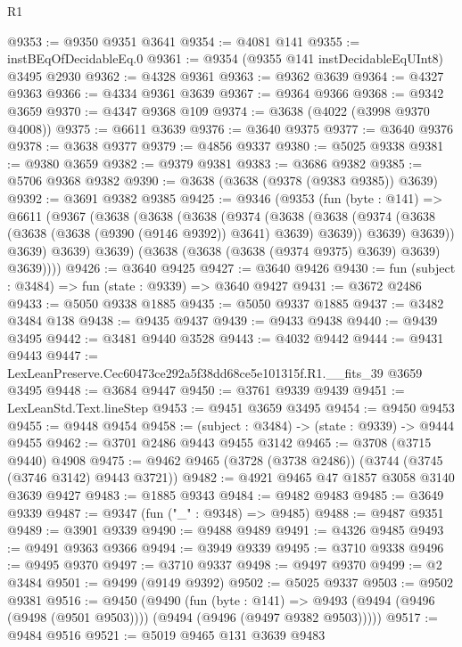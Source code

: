 \begin{lexlean}{R1}
\begin{coremodule}
@9353 := @9350 @9351 @3641
@9354 := @4081 @141
@9355 := instBEqOfDecidableEq.{0}
@9361 := @9354 (@9355 @141 instDecidableEqUInt8) @3495 @2930
@9362 := @4328 @9361
@9363 := @9362 @3639
@9364 := @4327 @9363
@9366 := @4334 @9361 @3639
@9367 := @9364 @9366
@9368 := @9342 @3659
@9370 := @4347 @9368 @109
@9374 := @3638 (@4022 (@3998 @9370 @4008))
@9375 := @6611 @3639
@9376 := @3640 @9375
@9377 := @3640 @9376
@9378 := @3638 @9377
@9379 := @4856 @9337
@9380 := @5025 @9338
@9381 := @9380 @3659
@9382 := @9379 @9381
@9383 := @3686 @9382
@9385 := @5706 @9368 @9382
@9390 := @3638 (@3638 (@9378 (@9383 @9385)) @3639)
@9392 := @3691 @9382 @9385
@9425 := @9346
    (@9353
      (fun (byte : @141) =>
      @6611
        (@9367
          (@3638
            (@3638
              (@3638
                (@9374
                  (@3638
                    (@3638
                      (@9374 (@3638 (@3638 (@3638 (@9390 (@9146 @9392)) @3641) @3639) @3639))
                      @3639)
                    @3639))
                @3639)
              @3639)
            @3639)
          (@3638 (@3638 (@3638 (@9374 @9375) @3639) @3639) @3639))))
@9426 := @3640 @9425
@9427 := @3640 @9426
@9430 := fun (subject : @3484) => fun (state : @9339) => @3640 @9427
@9431 := @3672 @2486
@9433 := @5050 @9338 @1885
@9435 := @5050 @9337 @1885
@9437 := @3482 @3484 @138
@9438 := @9435 @9437
@9439 := @9433 @9438
@9440 := @9439 @3495
@9442 := @3481 @9440 @3528
@9443 := @4032 @9442
@9444 := @9431 @9443
@9447 := LexLeanPreserve.Cec60473ce292a5f38dd68ce5e101315f.R1.__fits_39 @3659 @3495
@9448 := @3684 @9447
@9450 := @3761 @9339 @9439
@9451 := LexLeanStd.Text.lineStep
@9453 := @9451 @3659 @3495
@9454 := @9450 @9453
@9455 := @9448 @9454
@9458 := (subject : @3484) -> (state : @9339) -> @9444 @9455
@9462 := @3701 @2486 @9443 @9455 @3142
@9465 := @3708 (@3715 @9440) @4908
@9475 := @9462 @9465 (@3728 (@3738 @2486)) (@3744 (@3745 (@3746 @3142) @9443 @3721))
@9482 := @4921 @9465 @47 @1857 @3058 @3140 @3639 @9427
@9483 := @1885 @9343
@9484 := @9482 @9483
@9485 := @3649 @9339
@9487 := @9347 (fun ("_" : @9348) => @9485)
@9488 := @9487 @9351
@9489 := @3901 @9339
@9490 := @9488 @9489
@9491 := @4326 @9485
@9493 := @9491 @9363 @9366
@9494 := @3949 @9339
@9495 := @3710 @9338
@9496 := @9495 @9370
@9497 := @3710 @9337
@9498 := @9497 @9370
@9499 := @2 @3484
@9501 := @9499 (@9149 @9392)
@9502 := @5025 @9337
@9503 := @9502 @9381
@9516 := @9450
    (@9490
      (fun (byte : @141) =>
      @9493 (@9494 (@9496 (@9498 (@9501 @9503)))) (@9494 (@9496 (@9497 @9382 @9503)))))
@9517 := @9484 @9516
@9521 := @5019 @9465 @131 @3639 @9483

\end{coremodule}
\end{lexlean}

